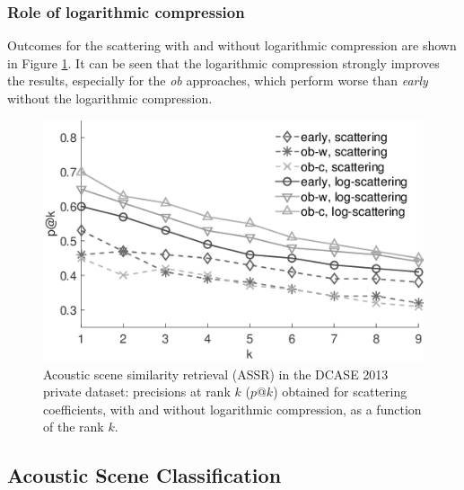 \documentclass[journal]{IEEEtran}
\begin{document}
\subsubsection*{Role of logarithmic compression}

Outcomes for the scattering with and without logarithmic compression are shown in Figure \ref{fig:ASS_2}. It can be seen that the logarithmic compression strongly improves the results, especially for the \emph{ob} approaches, which perform worse than \emph{early} without the logarithmic compression.


\begin{figure}[t]
\begin{center}
\includegraphics[width=.9\columnwidth]{bw/unsupervised_test1}
\caption{Acoustic scene similarity retrieval (ASSR) in the DCASE 2013 private dataset: precisions at rank $k$ ($p@k$) obtained for scattering coefficients, with and without logarithmic compression, as a function of the rank $k$.}
\label{fig:ASS_2}
\end{center}
\end{figure}

\subsection{Acoustic Scene Classification}
\end{document}
